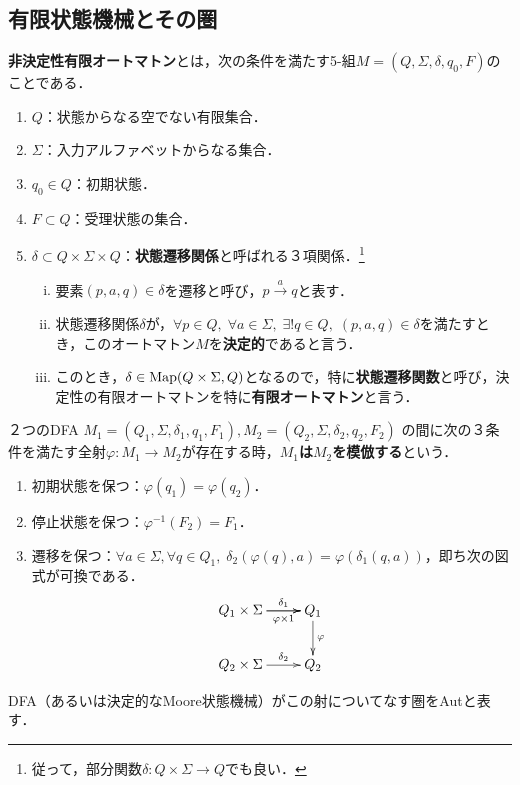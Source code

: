 \documentclass[uplatex, dvipdfmx]{jsreport}
\begin{document}
\subsection{有限状態機械とその圏}

\begin{definition}
    \textbf{非決定性有限オートマトン}とは，次の条件を満たす5-組$M=(Q,\Sigma,\delta,q_0,F)$のことである．
    \begin{enumerate}
        \item $Q$：状態からなる空でない有限集合．
        \item $\Sigma$：入力アルファベットからなる集合．
        \item $q_0\in Q$：初期状態．
        \item $F\subset Q$：受理状態の集合．
        \item $\delta\subset Q\times\Sigma\times Q$：\textbf{状態遷移関係}と呼ばれる３項関係．\footnote{従って，部分関数$\delta:Q\times\Sigma\to Q$でも良い．}
        \begin{enumerate}[(i)]
            \item 要素$(p,a,q)\in\delta$を遷移と呼び，$p\xrightarrow{a}q$と表す．
            \item 状態遷移関係$\delta$が，$\forall p\in Q,\;\forall a\in\Sigma,\;\exists!q\in Q,\;(p,a,q)\in\delta$を満たすとき，このオートマトン$M$を\textbf{決定的}であると言う．
            \item このとき，$\delta\in\mathrm{Map}(Q\times\Sigma,Q)$となるので，特に\textbf{状態遷移関数}と呼び，決定性の有限オートマトンを特に\textbf{有限オートマトン}と言う．
        \end{enumerate}
    \end{enumerate}
\end{definition}

\begin{definition}\label{def-category-of-DFA}
    ２つのDFA $M_1=(Q_1,\Sigma,\delta_1,q_1,F_1),M_2=(Q_2,\Sigma,\delta_2,q_2,F_2)$
    の間に次の３条件を満たす全射$\varphi:M_1\to M_2$が存在する時，\textbf{$M_1$は$M_2$を模倣する}という．
    \begin{enumerate}
        \item 初期状態を保つ：$\varphi(q_1)=\varphi(q_2)$．
        \item 停止状態を保つ：$\varphi^{-1}(F_2)=F_1$．
        \item 遷移を保つ：$\forall a\in\Sigma,\forall q\in Q_1,\;\delta_2(\varphi(q),a)=\varphi(\delta_1(q,a))$，即ち次の図式が可換である．
        \[\xymatrix{
            Q_1\times\Sigma\ar[r]^-{\delta_1}\ar[r]_-{\varphi\times 1}&Q_1\ar[d]^-{\varphi}\\
            Q_2\times\Sigma\ar[r]^-{\delta_2}&Q_2
        }\]
    \end{enumerate}
    DFA（あるいは決定的なMoore状態機械）がこの射についてなす圏をAutと表す．
\end{definition}
\end{document}
